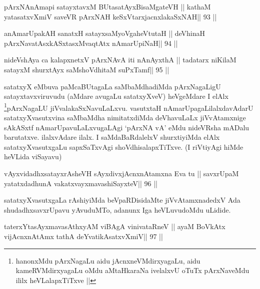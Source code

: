 
\begin{shl}
pArxNAnAmapi satayxtavxM \footnotemark[1]BUtasatAyxBisaMgateVH ||
kathaM yatasatxvXmiV saveVR pArxNAH keSxVtarxjacnxlakaSxNAH\hfill || 93 ||
\end{shl}

\begin{shl}
anAmarUpakAH sanatxH satayxsaMyoVgaheVtutaH ||
deVhinaH pArxNavatAsxkASxtasxMvaqtAtx nAmarUpiNaH\hfill || 94 ||
\end{shl}

\begin{shl}
nideVshAya ca kalapxnetxV pArxNAvA iti  nAnAyxthA ||
tadatarx niKilaM satayxM shurxtAyx saMshoVdhitaM suPxTamf\hfill || 95 ||
\end{shl}

\begin{artha}
satatxyX eMbuva paMcaBUtagaLa saMbaMdhadiMda pArxNagaLigU
satayxtavxviruvudu (aMdare avugaLu satatxyXveV) heVgeMdare I
elAlx \footnote[1]{hanonxMdu pArxNagaLu aidu jAcnxneVMdirxyagaLu, aidu
kameRVMdirxyagaLu oMdu aMtaHkaraNa ivelalxvU oTuTx pArxNaveMdu ililx
heVLalapxTiTxve ||}pArxNagaLU jiVvalakaSxNavuLaLxvu. vasutxtaH
nAmarUpagaLilalxdavAdarU satatxyXvasutxvina saMbaMdha nimitatxdiMda
deVhavuLaLx jiVvAtamxnige sAkASxtf nAmarUpavuLaLxvugaLAgi `pArxNA vA'
eMdu nideVRsha mADalu barutatxve. ilalxvAdare ilalx. I saMdaBaRdalelxV
shurxtiyiMda elAlx satatxyXvasutxgaLu sapxSaTxvAgi
shoVdhisalapxTiTxve. (I riVtiyAgi hiMde heVLida viSayavu) 
\end{artha}


\begin{shl}
vAyxvidadhxsatayxrAsheVH sAyxdivxjAcnxnAtamxna Eva tu ||
savxrUpaM yatatxdadhunA vakatxvayxmavashiSayxteV\hfill || 96 ||
\end{shl}

\begin{artha}
satatxyXvasutxgaLa rAshiyiMda beVpaRDisidaMte jiVvAtamxnadedxV Ada
shudadhxsavxrUpavu yAvuduMTo, adanunx Iga heVLuvudoMdu uLidide.
\end{artha}

\begin{shl}
taterxYtasAyxmavasAthxyAM viBAgA vinivataRneV ||
ayaM BoVkAtx vijAcnxnAtAmx tathA deYvatikAsatxvXmiV\hfill || 97 ||
\end{shl}

